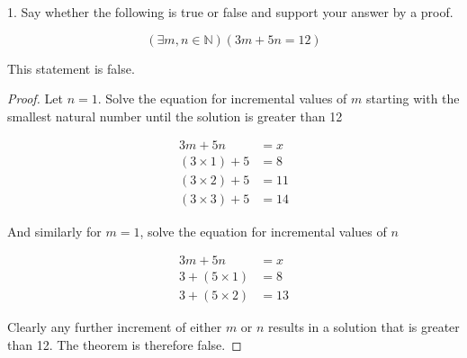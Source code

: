 \documentclass[a4paper,12pt]{article}
\begin{document}
1. Say whether the following is true or false and support your answer by a proof. 

$$(\exists m,n \in \mathbb{N}) (3m + 5n = 12)$$

This statement is false.

\begin{proof}
Let $n = 1$. Solve the equation for incremental values of $m$ starting with the smallest natural number until the solution is greater than 12

\begin{align*} 
  3m + 5n &= x \\ 
  (3 \times 1) + 5 &= 8 \\
  (3 \times 2) + 5 &= 11 \\
  (3 \times 3) + 5 &= 14
\end{align*}

And similarly for $m = 1$, solve the equation for incremental values of $n$

\begin{align*} 
  3m + 5n &= x \\ 
  3 + (5 \times 1) &= 8 \\
  3 + (5 \times 2) &= 13
\end{align*}

Clearly any further increment of either $m$ or $n$ results in a solution that is
greater than 12. The theorem is therefore false.
\end{proof}
\end{document}
